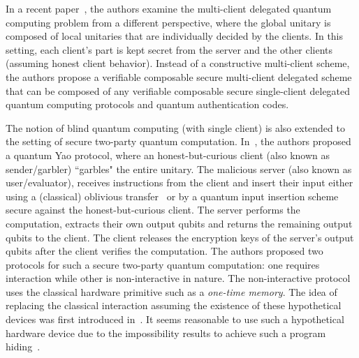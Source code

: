 In a recent paper~\cite{houshmand2018composable}, the authors examine the multi-client delegated quantum computing problem from a different perspective, where the global unitary is composed of local unitaries that are individually decided by the clients. In this setting, each client's part is kept secret from the server and the other clients (assuming honest client behavior).  Instead of a constructive multi-client scheme, the authors propose a verifiable composable secure multi-client delegated scheme that can be composed of any verifiable composable secure single-client delegated quantum computing protocols and quantum authentication codes. 

The notion of blind quantum computing (with single client) is also extended to the setting of secure two-party quantum computation. In~\cite{kashefi2017garbled}, the authors proposed a quantum Yao protocol, where an honest-but-curious client (also known as sender/garbler) ``garbles" the entire unitary.  The malicious server (also known as user/evaluator), receives instructions from the client and insert their input either using a (classical) oblivious transfer~\cite{rabin2005exchange} or by a quantum input insertion scheme secure against the honest-but-curious client.  The server performs the computation, extracts their own output qubits and returns the remaining output qubits to the client.  The client releases the encryption keys of the server's output qubits after the client verifies the computation. The authors proposed two protocols for such a secure two-party quantum computation: one requires interaction while other is non-interactive in nature. The non-interactive protocol uses the classical hardware primitive such as a \emph{one-time memory}. The idea of replacing the classical interaction assuming the existence of these hypothetical devices was first introduced in~\cite{broadbent2013quantum}.  It seems reasonable to use such a hypothetical hardware device due to the impossibility results to achieve such a program hiding~\cite{broadbent2013quantum, alagic2016quantum}. 


%
%


